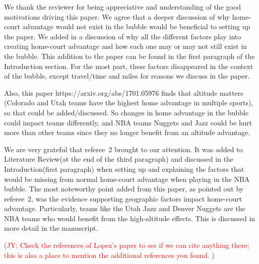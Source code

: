 \documentclass[12pt]{article}
\newcommand{\jy}[1]{\textcolor{red}{(JY: #1)}}
\newenvironment{comment}%
{\begin{quoting}\noindent\small\it\ignorespaces%
  }{\end{quoting}}
\begin{document}
 We thank the reviewer for being appreciative and understanding of the 
 good motivations driving this paper. We agree that a deeper discussion 
 of why home-court advantage would not exist in the bubble would be beneficial 
 to setting up the paper. We added in a discussion of why all the different 
 factors play into creating home-court advantage and how each one may or may 
 not still exist in the bubble. This addition to the paper can be found in the first paragraph
 of the Introduction section. For the most part, these factors disappeared 
 in the context of the bubble, except travel/time and miles for reasons we
 discuss in the paper. 

\begin{comment}
Also, this paper https://arxiv.org/abs/1701.05976 finds that altitude matters
(Colorado and Utah teams have the highest home advantage in multiple sports),
so that could be added/discussed. So changes in home advantage in the bubble
could impact teams differently, and NBA teams Nuggets and Jazz could be hurt
more than other teams since they no longer benefit from an altitude advantage.
\end{comment}

 We are very grateful that referee~2 brought \citet{Lopez} to our attention. 
 It was added to Literature Review(at the end of the third paragraph) and
 discussed in the Introduction(first paragraph) when setting 
 up and explaining the factors that would be missing from normal home-court 
 advantage when playing in the NBA bubble. The most noteworthy point added 
 from this paper, as pointed out by referee~2, was the evidence supporting 
 geographic factors impact home-court advantage. Particularly, teams like 
 the Utah Jazz and Denver Nuggets are the NBA teams who would benefit from 
 the high-altitude effects. This is discussed in more detail in the manuscript.

 \jy{Check the references of Lopez's paper to see if we can cite
   anything there; this is also a place to mention the additional
   references you found. }
\end{document}
